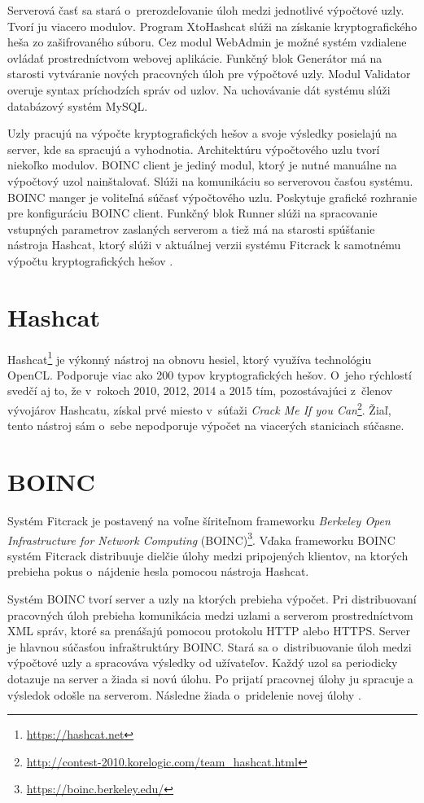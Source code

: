 \documentclass[zadani,slovak]{fitthesis}
\begin{document}
Serverová časť sa stará o~prerozdeľovanie úloh medzi jednotlivé výpočtové uzly. Tvorí ju viacero modulov. Program XtoHashcat slúži na získanie kryptografického heša zo zašifrovaného súboru. Cez modul WebAdmin je možné systém vzdialene ovládať prostredníctvom webovej aplikácie. Funkčný blok Generátor má na starosti vytváranie nových pracovných úloh pre výpočtové uzly. Modul Validator overuje syntax príchodzích správ od uzlov. Na uchovávanie dát systému slúži databázový systém MySQL.

Uzly pracujú na výpočte kryptografických hešov a svoje výsledky posielajú na server, kde sa spracujú a vyhodnotia. Architektúru výpočtového uzlu tvorí niekoľko modulov. BOINC client je jediný modul, ktorý je nutné manuálne na výpočtový uzol nainštalovať. Slúži na komunikáciu so serverovou časťou systému. BOINC manger je voliteľná súčasť výpočtového uzlu. Poskytuje grafické rozhranie pre konfiguráciu BOINC client. Funkčný blok Runner slúži na spracovanie vstupných parametrov zaslaných serverom a tiež má na starosti spúšťanie nástroja Hashcat, ktorý slúži v aktuálnej verzii systému Fitcrack k samotnému výpočtu kryptografických hešov \cite{fitcrackSprava}.



\section{Hashcat}\label{hashcat}
Hashcat\footnote{\url{https://hashcat.net}} je výkonný nástroj na obnovu hesiel, ktorý využíva technológiu OpenCL. Podporuje viac ako 200 typov kryptografických hešov. O~jeho rýchlostí svedčí aj to, že v~rokoch 2010, 2012, 2014 a 2015 tím, pozostávajúci z~členov vývojárov Hashcatu, získal prvé miesto v~súťaži \textit{Crack Me If you Can}\footnote{\url{http://contest-2010.korelogic.com/team_hashcat.html}}. Žiaľ, tento nástroj sám o~sebe nepodporuje výpočet na viacerých staniciach súčasne.


\section{BOINC} \label{BOINC}
Systém Fitcrack je postavený na voľne šíriteľnom frameworku \textit{Berkeley Open Infrastructure for Network Computing} (BOINC)\footnote{\url{https://boinc.berkeley.edu/}}. Vďaka frameworku BOINC systém Fitcrack distribuuje dielčie úlohy medzi pripojených klientov, na ktorých prebieha pokus o~nájdenie hesla pomocou nástroja Hashcat.

Systém BOINC tvorí server a uzly na ktorých prebieha výpočet. Pri distribuovaní pracovných úloh prebieha komunikácia medzi uzlami a serverom prostredníctvom XML správ, ktoré sa prenášajú pomocou protokolu HTTP alebo HTTPS.
Server je hlavnou súčasťou infraštruktúry BOINC. Stará sa o~distribuovanie úloh medzi výpočtové uzly a spracováva výsledky od užívateľov. Každý uzol sa periodicky dotazuje na server a žiada si novú úlohu. Po prijatí pracovnej úlohy ju spracuje a výsledok odošle na serverom. Následne žiada o~pridelenie novej úlohy \cite{boinccitace}.
\end{document}
